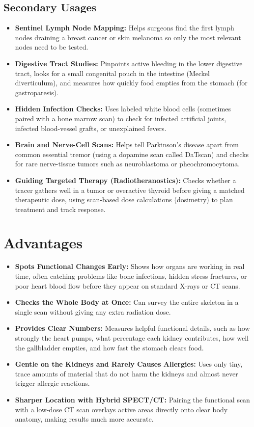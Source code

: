 \subsection{Secondary Usages}
\begin{itemize}
\item \textbf{Sentinel Lymph Node Mapping:} Helps surgeons find the first lymph nodes draining a breast cancer or skin melanoma so only the most relevant nodes need to be tested.
\item \textbf{Digestive Tract Studies:} Pinpoints active bleeding in the lower digestive tract, looks for a small congenital pouch in the intestine (Meckel diverticulum), and measures how quickly food empties from the stomach (for gastroparesis).
\item \textbf{Hidden Infection Checks:} Uses labeled white blood cells (sometimes paired with a bone marrow scan) to check for infected artificial joints, infected blood-vessel grafts, or unexplained fevers.
\item \textbf{Brain and Nerve-Cell Scans:} Helps tell Parkinson's disease apart from common essential tremor (using a dopamine scan called DaTscan) and checks for rare nerve-tissue tumors such as neuroblastoma or pheochromocytoma.
\item \textbf{Guiding Targeted Therapy (Radiotheranostics):} Checks whether a tracer gathers well in a tumor or overactive thyroid before giving a matched therapeutic dose, using scan-based dose calculations (dosimetry) to plan treatment and track response.
\end{itemize}

\section{Advantages}
\begin{itemize}
\item \textbf{Spots Functional Changes Early:} Shows how organs are working in real time, often catching problems like bone infections, hidden stress fractures, or poor heart blood flow before they appear on standard X-rays or CT scans.
\item \textbf{Checks the Whole Body at Once:} Can survey the entire skeleton in a single scan without giving any extra radiation dose.
\item \textbf{Provides Clear Numbers:} Measures helpful functional details, such as how strongly the heart pumps, what percentage each kidney contributes, how well the gallbladder empties, and how fast the stomach clears food.
\item \textbf{Gentle on the Kidneys and Rarely Causes Allergies:} Uses only tiny, trace amounts of material that do not harm the kidneys and almost never trigger allergic reactions.
\item \textbf{Sharper Location with Hybrid SPECT/CT:} Pairing the functional scan with a low-dose CT scan overlays active areas directly onto clear body anatomy, making results much more accurate.
\end{itemize}

